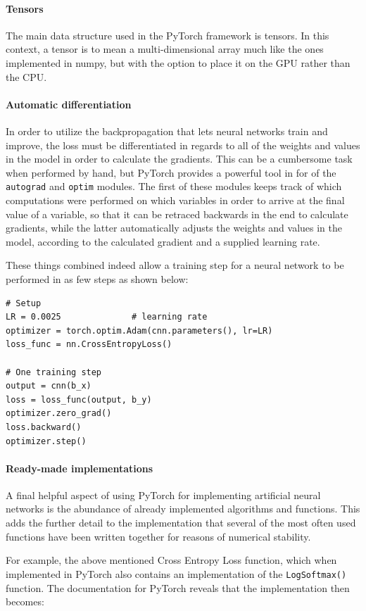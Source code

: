 \begin{multicols}{2}
\paragraph{Tensors}
The main data structure used in the PyTorch framework is tensors. In this context, a tensor is to mean a multi-dimensional array much like the ones implemented in numpy, but with the option to place it on the GPU rather than the CPU.
\paragraph{Automatic differentiation}
In order to utilize the backpropagation that lets neural networks train and improve, the loss must be differentiated in regards to all of the weights and values in the model in order to calculate the gradients. This can be a cumbersome task when performed by hand, but PyTorch provides a powerful tool in for of the \texttt{autograd} and \texttt{optim} modules. The first of these modules keeps track of which computations were performed on which variables in order to arrive at the final value of a variable, so that it can be retraced backwards in the end to calculate gradients, while the latter automatically adjusts the weights and values in the model, according to the calculated gradient and a supplied learning rate.

These things combined indeed allow a training step for a neural network to be performed in as few steps as shown below:
\begin{lstlisting}
# Setup
LR = 0.0025              # learning rate
optimizer = torch.optim.Adam(cnn.parameters(), lr=LR)
loss_func = nn.CrossEntropyLoss()

# One training step
output = cnn(b_x)
loss = loss_func(output, b_y)
optimizer.zero_grad()
loss.backward()
optimizer.step()
\end{lstlisting}

\paragraph{Ready-made implementations}
A final helpful aspect of using PyTorch for implementing artificial neural networks is the abundance of already implemented algorithms and functions. This adds the further detail to the implementation that several of the most often used functions have been written together for reasons of numerical stability. 

For example, the above mentioned Cross Entropy Loss function, which when implemented in PyTorch also contains an implementation of the \texttt{LogSoftmax()} function. The documentation for PyTorch reveals that the implementation then becomes:


\end{multicols}
